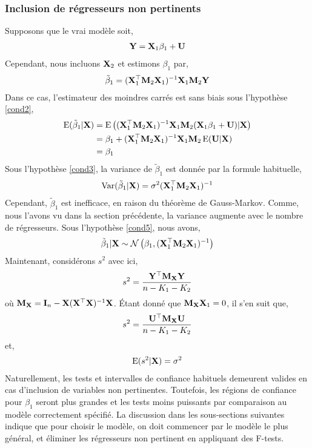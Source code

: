 \subsubsection*{Inclusion de régresseurs non pertinents}
Supposons que le vrai modèle soit,
\begin{align*}
\mathbf Y = \mathbf X_1\beta_1 + \mathbf U
\end{align*}
Cependant, nous incluons $\mathbf X_2$ et estimons $\beta_1$ par,
\begin{align*}
\tilde{\beta}_1 = (\mathbf X_1^\top\mathbf M_2\mathbf X_1)^{-1}\mathbf X_1\mathbf M_2\mathbf Y
\end{align*}
Dans ce cas, l'estimateur des moindres carrés est sans biais sous l'hypothèse \ref{cond2},
\begin{align*}
\operatorname{E}(\tilde{\beta}_1|\mathbf X) &=\operatorname{E}\left((\mathbf X_1^\top\mathbf M_2\mathbf X_1)^{-1}\mathbf X_1\mathbf M_2(\mathbf X_1\beta_1
+\mathbf U)|\mathbf X\right)\\
&=\beta_1 + (\mathbf X_1^\top\mathbf M_2\mathbf X_1)^{-1}\mathbf X_1\mathbf M_2\operatorname{E}(\mathbf U|\mathbf X)\\
&=\beta_1
\end{align*}
Sous l'hypothèse \ref{cond3}, la variance de $\tilde{\beta}_1$ est donnée par la formule habituelle,
\begin{align*}
\operatorname{Var}(\tilde{\beta}_1|\mathbf X) = \sigma^2(\mathbf X_1^\top\mathbf M_2\mathbf X_1)^{-1}
\end{align*}
Cependant, $\tilde{\beta}_1$ est inefficace, en raison du théorème de Gauss-Markov. Comme, nous l'avons vu dans la section précédente, la variance augmente avec le nombre de régresseurs. Sous l'hypothèse \ref{cond5}, nous avons,
\begin{align*}
\tilde{\beta}_1|\mathbf X \sim\mathcal{N}\left(\beta_1, (\mathbf X_1^\top\mathbf M_2\mathbf X_1)^{-1}\right)
\end{align*} 
Maintenant, considérons $s^2$ avec ici,
\begin{align*}
s^2 = \frac{\mathbf Y^\top\mathbf M_\mathbf X\mathbf Y}{n-K_1-K_2}
\end{align*}
où $\mathbf M_\mathbf X = \mathbf{I}_n - \mathbf X(\mathbf X^\top\mathbf X)^{-1}\mathbf X$. \'Etant donné que $\mathbf M_\mathbf X\mathbf X_1=0$, il s'en suit que,
\begin{align*}
s^2 = \frac{\mathbf U^\top\mathbf M_\mathbf X\mathbf U}{n-K_1-K_2}
\end{align*}
et,
\begin{align*}
\operatorname{E}(s^2|\mathbf X) = \sigma^2
\end{align*}
Naturellement, les tests et intervalles de confiance habituels demeurent valides en cas d'inclusion de variables non pertinentes. Toutefois, les régions de confiance pour $\beta_1$ seront plus grandes et les tests moins puissants par comparaison au modèle correctement spécifié. La discussion dans les sous-sections suivantes indique que pour choisir le modèle, on doit commencer par le modèle le plus général, et éliminer les régresseurs non pertinent en appliquant des F-tests.
